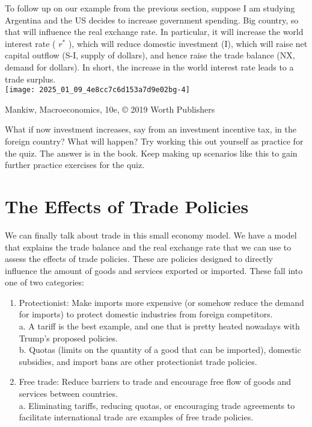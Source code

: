 \documentclass[10pt]{article}
\begin{document}
To follow up on our example from the previous section, suppose I am studying Argentina and the US decides to increase government spending. Big country, so that will influence the real exchange rate. In particular, it will increase the world interest rate ( $r^{*}$ ), which will reduce domestic investment (I), which will raise net capital outflow (S-I, supply of dollars), and hence raise the trade balance (NX, demand for dollars). In short, the increase in the world interest rate leads to a trade surplus.\\
\texttt{[image: 2025\_01\_09\_4e8cc7c6d153a7d9e02bg-4]}

Mankiw, Macroeconomics, 10e, © 2019 Worth Publishers

What if now investment increases, say from an investment incentive tax, in the foreign country? What will happen? Try working this out yourself as practice for the quiz. The answer is in the book. Keep making up scenarios like this to gain further practice exercises for the quiz.

\section*{The Effects of Trade Policies}
We can finally talk about trade in this small economy model. We have a model that explains the trade balance and the real exchange rate that we can use to assess the effects of trade policies. These are policies designed to directly influence the amount of goods and services exported or imported. These fall into one of two categories:

\begin{enumerate}
  \item Protectionist: Make imports more expensive (or somehow reduce the demand for imports) to protect domestic industries from foreign competitors.\\
a. A tariff is the best example, and one that is pretty heated nowadays with Trump's proposed policies.\\
b. Quotas (limits on the quantity of a good that can be imported), domestic subsidies, and import bans are other protectionist trade policies.
  \item Free trade: Reduce barriers to trade and encourage free flow of goods and services between countries.\\
a. Eliminating tariffs, reducing quotas, or encouraging trade agreements to facilitate international trade are examples of free trade policies.
\end{enumerate}
\end{document}
